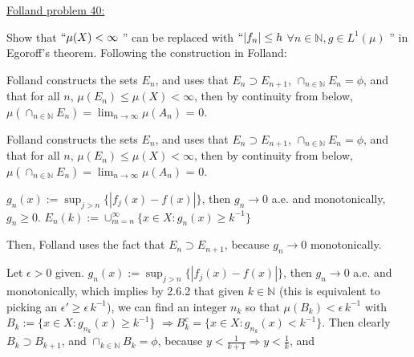 \documentclass[12pt]{article}
\newcommand{\nats}[0] { \mathbb{N}}
\newcommand{\eps}[0] {  \epsilon }
\newcommand{\rimply}[0] { \Rightarrow }
\begin{document}
\begin{flushleft}
\underline{Folland problem 40:}
\end{flushleft}

\begin{flushleft}
Show that $``\mu(X) < \infty$ '' can be replaced with $``|f_n| \le h $ $\forall n \in \nats, g \in L^1(\mu)$ '' in Egoroff's theorem. 
Following the construction in Folland:
\end{flushleft}

\begin{flushleft}
Folland constructs the sets $E_n$, and uses that $E_n \supset E_{n+1}$, $\cap_{n \in \nats} E_n=\phi$, and that for all $n$, $\mu(E_n) \le \mu(X) < \infty$, then by continuity from below, $\mu(\cap_{n \in \nats} E_n)= \lim_{n \rightarrow \infty} \mu(A_n)$ = 0.
\end{flushleft}

\begin{flushleft}
Folland constructs the sets $E_n$, and uses that $E_n \supset E_{n+1}$, $\cap_{n \in \nats} E_n=\phi$, and that for all $n$, $\mu(E_n) \le \mu(X) < \infty$, then by continuity from below, $\mu(\cap_{n \in \nats} E_n)= \lim_{n \rightarrow \infty} \mu(A_n)$ = 0.
\end{flushleft}

\begin{flushleft}
$g_n(x) := \sup_{j>n} \{ |f_j(x) - f(x) | \}$, then $g_n \rightarrow 0$ a.e. and monotonically, $g_n \ge 0$. $E_n(k) := \cup_{m=n}^\infty \{ x \in X: g_n(x) \ge k^{-1} \}$
\end{flushleft}

\begin{flushleft}
Then, Folland uses the fact that $E_n \supset E_{n+1}$, because $g_n \rightarrow 0$ monotonically.
\end{flushleft}

\begin{flushleft}
Let $\eps>0$ given. $g_n(x) := \sup_{j>n} \{ |f_j(x) - f(x) | \}$, then $g_n \rightarrow 0$ a.e. and monotonically, which implies by 2.6.2 that given $k \in \nats$ (this is equivalent to picking an $\eps' \ge \eps \, k^{-1}$), we can find an integer $n_k$ so that $\mu(B_k) < \eps \, k^{-1}$ with $B_k := \{ x \in X: g_{n_k}(x) \ge k^{-1} \}$ $ \rimply B_k^c = \{ x \in X: g_{n_k}(x) < k^{-1} \}$. Then clearly $B_k \supset B_{k+1}$, and $\cap_{k \in \nats} B_k = \phi$, because $y < \frac{1}{k+1} \rimply y < \frac{1}{k}$, and 

\end{flushleft}
\end{document}
